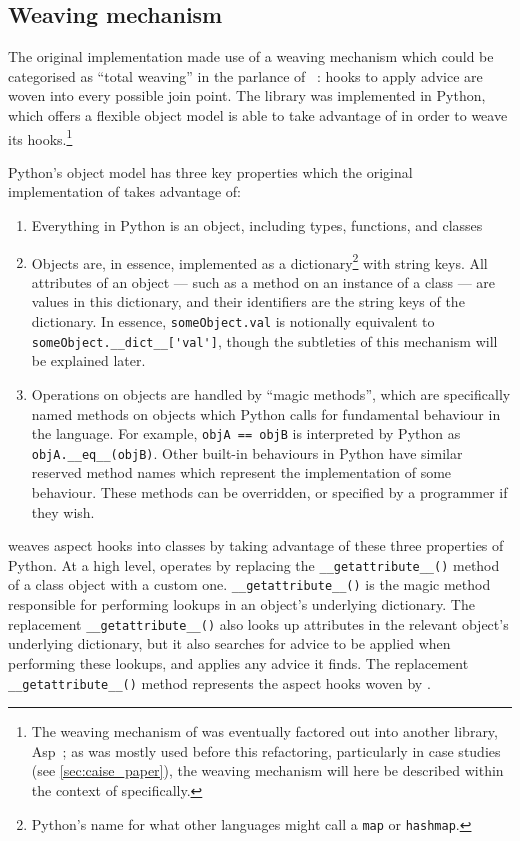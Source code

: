 \subsection{Weaving mechanism}\label{subsec:prior_work_weaving}
The original \pdsf implementation made use of a weaving mechanism which could be
categorised as ``total weaving'' in the parlance of
\citeauthor{dynamicAOchitchyan}~\cite{dynamicAOchitchyan}: hooks to apply advice
are woven into every possible join point. The library was implemented in Python,
which offers a flexible object model \pdsf is able to take advantage of in order
to weave its hooks.\footnote{The weaving mechanism of \pdsf was eventually
factored out into another library, Asp~\cite{asp_repo}; as \pdsf was mostly used
before this refactoring, particularly in case studies (see \cref{sec:caise_paper}), the weaving mechanism will here be described
within the context of \pdsf specifically.}

Python's object model has three key properties which the original implementation
of \pdsf takes advantage of:

\begin{enumerate}
    \item Everything in Python is an object, including types, functions, and
    classes
    \item Objects are, in essence, implemented as a dictionary\footnote{Python's
    name for what other languages might call a \lstinline{map} or
    \lstinline{hashmap}.} with string keys. All attributes of an object --- such
    as a method on an instance of a class --- are values in this dictionary, and
    their identifiers are the string keys of the dictionary. In essence,
    \lstinline{someObject.val} is notionally equivalent to
    \lstinline{someObject.__dict__['val']}, though the subtleties of this
    mechanism will be explained later.
    \item Operations on objects are handled by ``magic methods'', which are
    specifically named methods on objects which Python calls for fundamental
    behaviour in the language. For example, \lstinline{objA == objB} is
    interpreted by Python as \lstinline{objA.__eq__(objB)}. Other built-in
    behaviours in Python have similar reserved method names which represent the
    implementation of some behaviour. These methods can be overridden, or
    specified by a programmer if they wish.
\end{enumerate}

\pdsf weaves aspect hooks into classes by taking advantage of these three
properties of Python. At a high level, \pdsf operates by replacing the
\lstinline{__getattribute__()} method of a class object with a custom one.
\lstinline{__getattribute__()} is the magic method responsible for performing
lookups in an object's underlying dictionary. The replacement
\lstinline{__getattribute__()} also looks up attributes in the relevant object's
underlying dictionary, but it also searches for advice to be applied when
performing these lookups, and applies any advice it finds. The replacement
\lstinline{__getattribute__()} method represents the aspect hooks woven by
\pdsf{}.

